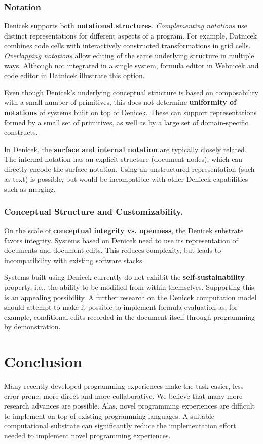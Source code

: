 \documentclass[sigconf,anonymous,screen]{acmart}
\begin{document}
\subsubsection*{Notation}
Denicek supports both \textbf{notational structures}. \emph{Complementing notations} use
distinct representations for different aspects of a program. For example, Datnicek combines code cells with
interactively constructed transformations in grid cells. \emph{Overlapping notations} allow editing
of the same underlying structure in multiple ways. Although not integrated in a single system,
formula editor in Webnicek and code editor in Datnicek illustrate this option.

Even though Denicek's underlying conceptual structure is based on composability with a small number of
primitives, this does not determine \textbf{uniformity of notations} of systems built on top
of Denicek. These can support representations formed by a small set of primitives, as well as
by a large set of domain-specific constructs.

In Denicek, the \textbf{surface and internal notation} are typically closely related. The
internal notation has an explicit structure (document nodes), which can directly encode the surface
notation. Using an unstructured representation (such as text) is possible, but would be
incompatible with other Denicek capabilities such as merging.

\subsubsection*{Conceptual Structure and Customizability.}
On the scale of \textbf{conceptual integrity vs. openness}, the Denicek substrate favors integrity.
Systems based on Denicek need to use its representation of documents and document edits. This reduces
complexity, but leads to incompatibility with existing software stacks.

Systems built using Denicek currently do not exhibit the \textbf{self-sustainability} property,
i.e., the ability to be modified from within themselves. Supporting this is an appealing
possibility. A further research on the Denicek computation model should attempt to make it possible
to implement formula evaluation as, for example, conditional edits recorded in the document itself
through programming by demonstration.


\section{Conclusion}
Many recently developed programming experiences make the task easier, less error-prone,
more direct and more collaborative. We believe that many more research advances are possible.
Alas, novel programming experiences are difficult to implement on top of
existing programming languages. A suitable computational substrate can
significantly reduce the implementation effort needed to implement novel programming experiences.
\end{document}
